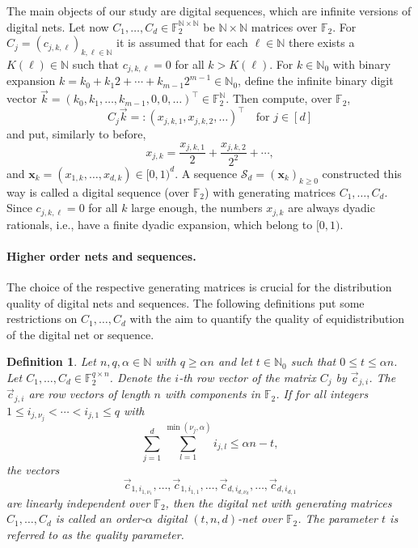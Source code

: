 \documentclass[12pt, a4paper]{article}
\newtheorem{defin}[thm]{Definition}
\def\S{\mathcal{S}}
\newcommand{\N}{{\mathbb{N}}} %
\begin{document}
The main objects of our study are digital sequences, which are infinite versions of digital nets. Let now $C_1,\ldots, C_d \in \mathbb{F}_2^{\mathbb{N} \times \mathbb{N}}$ be $\mathbb{N} \times \mathbb{N}$ matrices over $\mathbb{F}_2$. For $C_j = (c_{j,k,\ell})_{k, \ell \in \mathbb{N}}$ it is assumed that for each $\ell \in \mathbb{N}$ there exists a $K(\ell) \in \mathbb{N}$ such that $c_{j,k,\ell} = 0$ for all $k > K(\ell)$. For $k \in \N_0$ with binary expansion $k = k_0 + k_1 2 + \cdots + k_{m-1} 2^{m-1} \in \mathbb{N}_0$,  define the infinite binary digit vector $\vec{k} = (k_0, k_1, \ldots, k_{m-1}, 0, 0, \ldots )^\top \in \mathbb{F}_2^{\mathbb{N}}$. Then compute, over $\mathbb{F}_2$,
\begin{equation*}
C_j \vec{k}=:(x_{j,k,1}, x_{j,k,2},\ldots)^\top \quad \mbox{for } j \in [d]
\end{equation*}
and put, similarly to before,
\begin{equation*}
x_{j,k} = \frac{x_{j,k,1}}{2} + \frac{x_{j,k,2}}{2^2} + \cdots ,
\end{equation*}
and $\boldsymbol{x}_k = (x_{1,k}, \ldots, x_{d,k}) \in [0,1)^d$. A sequence $\S_d=(\boldsymbol{x}_k)_{k \ge 0}$ constructed this way is called a {digital sequence (over $\mathbb{F}_2$) with generating matrices} $C_1,\ldots,C_d$. Since $c_{j,k,\ell}=0$ for all $k$ large enough, the numbers $x_{j,k}$ are always dyadic rationals, i.e., have a finite dyadic expansion, which belong to $[0,1)$. 

\paragraph{Higher order nets and sequences.}%

The choice of the respective generating matrices is crucial for the distribution quality of digital nets and sequences. The following definitions put some restrictions on $C_1,\ldots ,C_d$ with the aim to quantify the quality of equidistribution of the digital net or sequence.

\begin{defin}\rm\label{def_net}
Let $n, q, \alpha \in \N$ with $q \ge \alpha n$ and let $t \in \N_0$ such that $0 \le t \le \alpha n$. Let $C_1,\ldots, C_d \in \mathbb{F}_2^{q \times n}$. Denote the $i$-th row vector of the matrix $C_j$ by $\vec{c}_{j,i}$. The $\vec{c}_{j,i}$ are row vectors of length $n$ with components in $\mathbb{F}_2$. If for all integers $1 \le i_{j,\nu_j} < \cdots <
i_{j,1} \le q$ with 
\[
\sum_{j = 1}^d \sum_{l=1}^{\min(\nu_j,\alpha)} i_{j,l}  \le
\alpha n - t,
\] 
the vectors
\[
\vec{c}_{1,i_{1,\nu_1}}, \ldots, \vec{c}_{1,i_{1,1}}, \ldots,
\vec{c}_{d,i_{d,\nu_d}}, \ldots, \vec{c}_{d,i_{d,1}}
\] 
are linearly independent
over $\mathbb{F}_2$, then the digital net with generating matrices
$C_1,\ldots, C_d$ is called an {order-$\alpha$ digital $(t,n,d)$-net over $\mathbb{F}_2$}. The parameter $t$ is referred to as the quality parameter.
\end{defin}
\end{document}
